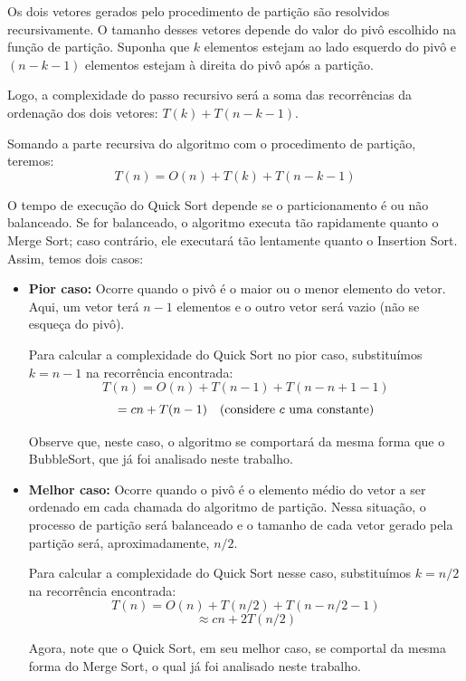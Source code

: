 Os dois vetores gerados pelo procedimento de partição são resolvidos recursivamente. O tamanho desses vetores depende do valor do pivô escolhido na função de partição. Suponha que \( k \) elementos estejam ao lado esquerdo do pivô e \( (n - k - 1) \) elementos estejam à direita do pivô após a partição.

Logo, a complexidade do passo recursivo será a soma das recorrências da ordenação dos dois vetores: \( T(k) + T(n - k - 1) \).

Somando a parte recursiva do algoritmo com o procedimento de partição, teremos:
\[
	T(n) = O(n) + T(k) + T(n - k - 1)
\]

O tempo de execução do Quick Sort depende se o particionamento é ou não balanceado. Se for balanceado, o algoritmo executa tão rapidamente quanto o Merge Sort; caso contrário, ele executará tão lentamente quanto o Insertion Sort. Assim, temos dois casos:

\begin{itemize}
	\item \textbf{Pior caso:} Ocorre quando o pivô é o maior ou o menor elemento do vetor. Aqui, um vetor terá \( n-1 \) elementos e o outro vetor será vazio (não se esqueça do pivô).

	      Para calcular a complexidade do Quick Sort no pior caso, substituímos \( k = n - 1 \) na recorrência encontrada:
	      \[
		      T(n) = O(n) + T(n-1) + T(n - n + 1 - 1)
	      \]
	      \[
		      = cn + T(n-1) \quad \text{(considere \( c \) uma constante)}
	      \]

	      Observe que, neste caso, o algoritmo se comportará da mesma forma que o BubbleSort, que já foi analisado neste trabalho.

	\item \textbf{Melhor caso:} Ocorre quando o pivô é o elemento médio do vetor a ser ordenado em cada chamada do algoritmo de partição. Nessa situação, o processo de partição será balanceado e o tamanho de cada vetor gerado pela partição será, aproximadamente, \( n/2 \).

	      Para calcular a complexidade do Quick Sort nesse caso, substituímos \( k = n/2 \) na recorrência encontrada:
	      \[
		      T(n) = O(n) + T(n/2) + T(n - n/2 - 1)
	      \]
	      \[
		      \approx cn + 2T(n/2)
	      \]

	      Agora, note que o Quick Sort, em seu melhor caso, se comportal da mesma forma do Merge Sort, o qual já foi analisado neste trabalho.

\end{itemize}

